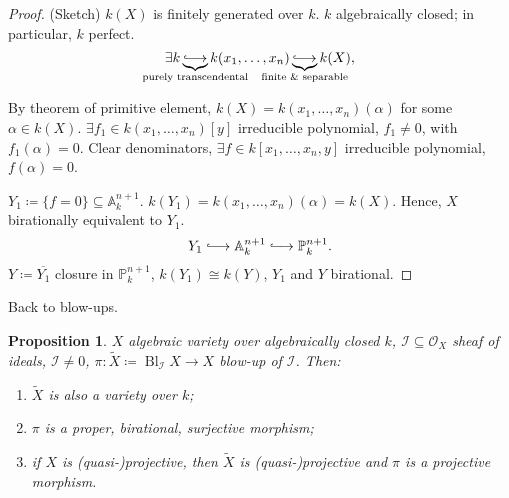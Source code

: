 \documentclass[12pt]{article}
\DeclareMathOperator{\Bl}{Bl}
\newtheorem*{proposition}{Proposition}
\theoremstyle{definition}
\theoremstyle{remark}
\begin{document}
\begin{proof}
(Sketch) $k(X)$ is finitely generated over $k$. $k$ algebraically closed; in particular, $k$ perfect.
\[\exists k\underbrace{\lhook\joinrel\longrightarrow}_{\mathclap{\text{purely transcendental}}}k(x_1,\ldots,x_n)\underbrace{\lhook\joinrel\longrightarrow}_{\mathclap{\text{finite \& separable}}}k(X),\]

By theorem of primitive element, $k(X)=k(x_1,\ldots,x_n)(\alpha)$ for some $\alpha\in k(X)$. $\exists f_1\in k(x_1,\ldots,x_n)[y]$ irreducible polynomial, $f_1\neq0$, with $f_1(\alpha)=0$. Clear denominators, $\exists f\in k[x_1,\ldots,x_n,y]$ irreducible polynomial, $f(\alpha)=0$.

$Y_1\coloneqq\{f=0\}\subseteq\mathbb{A}_k^{n+1}$. $k(Y_1)=k(x_1,\ldots,x_n)(\alpha)=k(X)$. Hence, $X$ birationally equivalent to $Y_1$.
\[Y_1\lhook\joinrel\longrightarrow\mathbb{A}_k^{n+1}\lhook\joinrel\longrightarrow\mathbb{P}_k^{n+1}.\]
$Y\coloneqq\overline{Y_1}$ closure in $\mathbb{P}_k^{n+1}$, $k(Y_1)\cong k(Y)$, $Y_1$ and $Y$ birational.
\end{proof}

Back to blow-ups.

\begin{proposition}
$X$ algebraic variety over algebraically closed $k$, $\mathcal{I}\subseteq\mathcal{O}_X$ sheaf of ideals, $\mathcal{I}\neq0$, $\pi:\widetilde{X}\coloneqq\Bl_{\mathcal{I}}X\rightarrow X$ blow-up of $\mathcal{I}$. Then:
\begin{enumerate}[label=\arabic*)]
\item $\widetilde{X}$ is also a variety over $k$;
\item $\pi$ is a proper, birational, surjective morphism;
\item if $X$ is (quasi-)projective, then $\widetilde{X}$ is (quasi-)projective and $\pi$ is a projective morphism.
\end{enumerate}
\end{proposition}
\end{document}
